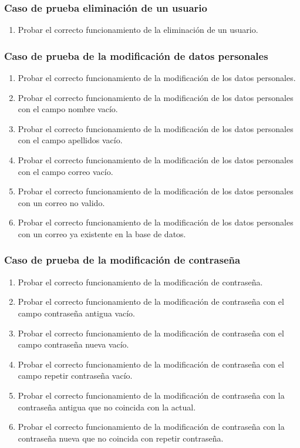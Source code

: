 \subsubsection{Caso de prueba eliminación de un usuario}

\begin{enumerate}
    \item Probar el correcto funcionamiento de la eliminación de un usuario.
\end{enumerate}

\subsubsection{Caso de prueba de la modificación de datos personales}

\begin{enumerate}
    \item Probar el correcto funcionamiento de la modificación de los datos personales.
    \item Probar el correcto funcionamiento de la modificación de los datos personales con el campo nombre vacío.
    \item Probar el correcto funcionamiento de la modificación de los datos personales con el campo apellidos vacío.
    \item Probar el correcto funcionamiento de la modificación de los datos personales con el campo correo vacío.
    \item Probar el correcto funcionamiento de la modificación de los datos personales con un correo no valido.
    \item Probar el correcto funcionamiento de la modificación de los datos personales con un correo ya existente en la base de datos.
\end{enumerate}

\subsubsection{Caso de prueba de la modificación de contraseña}

\begin{enumerate}
    \item Probar el correcto funcionamiento de la modificación de contraseña.
    \item Probar el correcto funcionamiento de la modificación de contraseña con el campo contraseña antigua vacío.
    \item Probar el correcto funcionamiento de la modificación de contraseña con el campo contraseña nueva vacío.
    \item Probar el correcto funcionamiento de la modificación de contraseña con el campo repetir contraseña vacío.
    \item Probar el correcto funcionamiento de la modificación de contraseña con la contraseña antigua que no coincida con la actual.
    \item Probar el correcto funcionamiento de la modificación de contraseña con la contraseña nueva que no coincida con repetir contraseña.
\end{enumerate}


